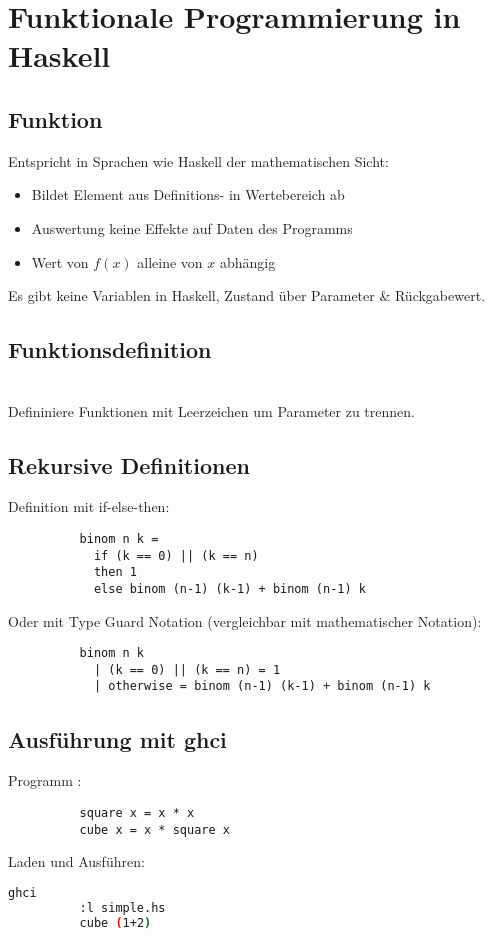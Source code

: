 
\lstset{language=Haskell,mathescape=true}

\section{Funktionale Programmierung in Haskell}%
\label{hsk:sec:funktionale-programmierung}

\subsection{Funktion}%
\label{hsk:sub:funktion}
Entspricht in Sprachen wie Haskell der mathematischen Sicht:
\begin{itemize}
  \item Bildet Element aus Definitions- in Wertebereich ab
  \item Auswertung keine Effekte auf Daten des Programms
  \item Wert von \(f(x)\) alleine von \(x\) abhängig
\end{itemize}
Es gibt keine Variablen in Haskell, Zustand über Parameter \& Rückgabewert.  

\subsection{Funktionsdefinition}%
\label{hsk:sub:funktionsdefinition}
\\
Defininiere Funktionen mit Leerzeichen um Parameter zu trennen.

\subsection{Rekursive Definitionen}%
\label{hsk:sub:rekursive-definitionen}
Definition mit if-else-then:
\begin{lstlisting}
          binom n k =
            if (k == 0) || (k == n)
            then 1
            else binom (n-1) (k-1) + binom (n-1) k
\end{lstlisting}
Oder mit Type Guard Notation (vergleichbar mit mathematischer Notation):
\begin{lstlisting}
          binom n k
            | (k == 0) || (k == n) = 1
            | otherwise = binom (n-1) (k-1) + binom (n-1) k
\end{lstlisting}

\subsection{Ausführung mit ghci}%
\label{hsk:sub:ausfuehrung}
Programm :
\begin{lstlisting}
          square x = x * x
          cube x = x * square x
\end{lstlisting}
Laden und Ausführen:
\begin{lstlisting}[language=bash]
          ghci
          :l simple.hs
          cube (1+2)
\end{lstlisting}

